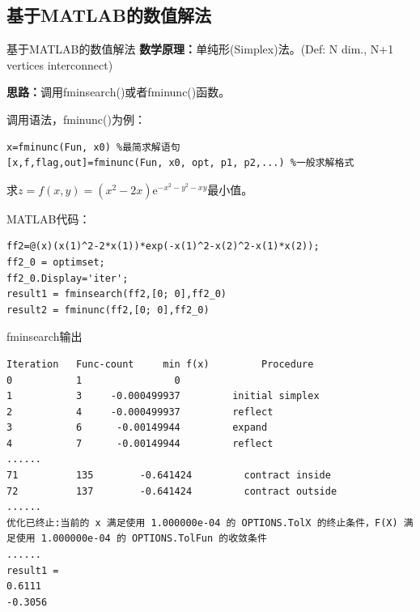 \documentclass[12pt]{beamer}
\begin{document}
	\subsection{基于MATLAB的数值解法}
		\begin{frame}[fragile]{基于MATLAB的数值解法}
			\textbf{数学原理：}单纯形(Simplex)法。{\scriptsize(Def: N dim., N+1 vertices interconnect)}
			
			\textbf{思路：}调用fminsearch()或者fminunc()函数。
			
			\begin{block}{调用语法，fminunc()为例：}
\begin{lstlisting}
x=fminunc(Fun, x0) %最简求解语句
[x,f,flag,out]=fminunc(Fun, x0, opt, p1, p2,...) %一般求解格式
\end{lstlisting}
			\end{block}	  
		
		\begin{example}[6-12]
求$z=f(x, y)=\left(x^{2}-2 x\right) \mathrm{e}^{-x^{2}-y^{2}-x y}$最小值。
		\end{example}
			
			\begin{block}{MATLAB代码：}
\begin{lstlisting}
ff2=@(x)(x(1)^2-2*x(1))*exp(-x(1)^2-x(2)^2-x(1)*x(2));
ff2_0 = optimset;
ff2_0.Display='iter';
result1 = fminsearch(ff2,[0; 0],ff2_0)
result2 = fminunc(ff2,[0; 0],ff2_0)
\end{lstlisting}
			\end{block}	 
		
		\end{frame}
	
\begin{frame}[t,fragile]{fminsearch输出}
		
		\begin{lstlisting}
Iteration   Func-count     min f(x)         Procedure
0           1                0         
1           3     -0.000499937         initial simplex
2           4     -0.000499937         reflect
3           6      -0.00149944         expand
4           7      -0.00149944         reflect
......
71          135        -0.641424         contract inside
72          137        -0.641424         contract outside
......
优化已终止:当前的 x 满足使用 1.000000e-04 的 OPTIONS.TolX 的终止条件，F(X) 满足使用 1.000000e-04 的 OPTIONS.TolFun 的收敛条件
......
result1 =
0.6111
-0.3056
\end{lstlisting}
		
\end{frame}
\end{document}
